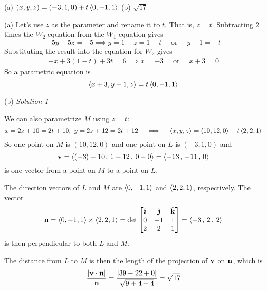 %

\begin{answer}
(a) $(x,y,z) = (-3,1,0) +t \left< 0,-1,1\right>$\qquad
(b) $\sqrt{17}$\qquad
\end{answer}

\begin{solution}
(a) Let's use $z$ as the parameter and rename it to $t$.
That is, $z=t$. Subtracting $2$ times the $W_2$ equation from the $W_1$
equation gives
\begin{equation*}
-5y -5z = -5
\implies y = 1-z = 1-t\quad\text{ or }\quad y-1=-t
\end{equation*}
Substituting the result into the equation for $W_2$ gives
\begin{align*}
-x +3(1-t) +3t =6
\implies x = -3\quad\text{ or }\quad x+3=0
\end{align*}
So a parametric equation is
\begin{equation*}
\left< x+3,y-1,z\right> = t \left< 0,-1,1\right>
\end{equation*}

(b) \emph{Solution 1}\ \ \ 

We can also parametrize $M$ using $z=t$:
\begin{equation*}
x=2z+10=2t+10,\ 
y=2z+12=2t+12\quad\implies\quad
\llt x,y,z\rgt = \llt 10,12,0\rgt +t \llt 2,2,1\rgt
\end{equation*}
So one point on $M$ is $(10,12,0)$ and one point on $L$ is $(-3,1,0)$ and
\begin{equation*}
\mathbf{v}= \left< (-3)-10\,,\, 1 -12  \,,\,  0-0\right>
   =\left<  -13 \,,\, -11  \,,\, 0\right>
\end{equation*}
is one vector from a point on $M$ to a point on $L$.

The direction vectors of $L$ and $M$ are $\left< 0,-1,1\right>$ and 
$\left< 2,2,1\right>$, respectively. The vector
\begin{align*}
\mathbf{n} = \left< 0,-1,1\right> \times \left< 2,2,1\right>
=\det\left[\begin{matrix}
            \hat{\pmb{\imath}}  &  \hat{\pmb{\jmath}}  &  \hat{\mathbf{k}} \\
            0    &  -1   &    1 \\
            2    &   2   &    1 
            \end{matrix}\right]
=\left< -3 \,,\, 2 \,,\, 2 \right>
\end{align*}
is then perpendicular to both $L$ and $M$.

The distance from $L$ to $M$ is then the length of the projection 
of $\mathbf{v}$ on $\mathbf{n}$, which is
\begin{align*}
\frac{|\mathbf{v}\cdot\mathbf{n}|}{|\mathbf{n}|}
=\frac{|39-22+0|}{\sqrt{9+4+4}}
=\sqrt{17}
\end{align*}



\end{solution}
